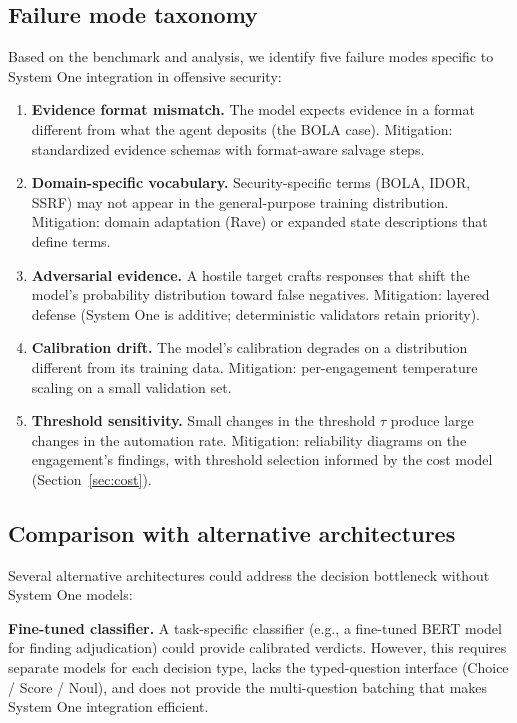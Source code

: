 \documentclass[conference]{IEEEtran}
\begin{document}
\subsection{Failure mode taxonomy}

Based on the benchmark and analysis, we identify five failure modes specific to System One integration in offensive security:

\begin{enumerate}[leftmargin=*]
\item \textbf{Evidence format mismatch.} The model expects evidence in a format different from what the agent deposits (the BOLA case). Mitigation: standardized evidence schemas with format-aware salvage steps.

\item \textbf{Domain-specific vocabulary.} Security-specific terms (BOLA, IDOR, SSRF) may not appear in the general-purpose training distribution. Mitigation: domain adaptation (Rave) or expanded state descriptions that define terms.

\item \textbf{Adversarial evidence.} A hostile target crafts responses that shift the model's probability distribution toward false negatives. Mitigation: layered defense (System One is additive; deterministic validators retain priority).

\item \textbf{Calibration drift.} The model's calibration degrades on a distribution different from its training data. Mitigation: per-engagement temperature scaling on a small validation set.

\item \textbf{Threshold sensitivity.} Small changes in the threshold $\tau$ produce large changes in the automation rate. Mitigation: reliability diagrams on the engagement's findings, with threshold selection informed by the cost model (Section~\ref{sec:cost}).
\end{enumerate}

\subsection{Comparison with alternative architectures}

Several alternative architectures could address the decision bottleneck without System One models:

\textbf{Fine-tuned classifier.} A task-specific classifier (e.g., a fine-tuned BERT model for finding adjudication) could provide calibrated verdicts. However, this requires separate models for each decision type, lacks the typed-question interface (Choice / Score / Noul), and does not provide the multi-question batching that makes System One integration efficient.
\end{document}

